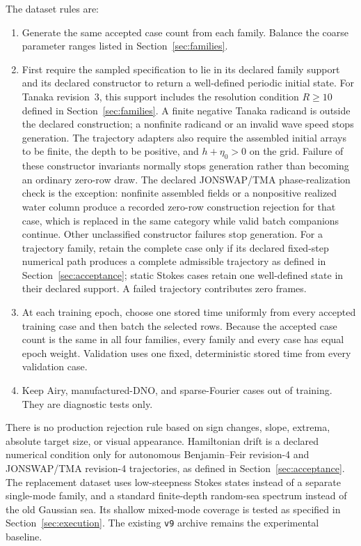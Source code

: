\documentclass[11pt]{article}
\begin{document}
The dataset rules are:
\begin{enumerate}
  \item Generate the same accepted case count from each family.  Balance
        the coarse parameter ranges listed in Section~\ref{sec:families}.
  \item First require the sampled specification to lie in its declared
        family support and its declared constructor to return a well-defined
        periodic initial state.  For Tanaka revision~3, this support includes
        the resolution condition $R\geq10$ defined in
        Section~\ref{sec:families}.  A finite negative Tanaka radicand is
        outside the declared construction; a nonfinite radicand or an invalid
        wave speed stops generation.  The trajectory
        adapters also require the assembled initial arrays to be finite, the
        depth to be positive, and \(h+\eta_0>0\) on the grid.  Failure of
        these constructor invariants normally stops generation rather than
        becoming an ordinary zero-row draw.  The declared JONSWAP/TMA
        phase-realization check is the exception: nonfinite assembled fields
        or a nonpositive realized water column produce a recorded zero-row
        construction rejection for that case, which is replaced in the same
        category while valid batch companions continue.  Other unclassified
        constructor failures stop generation.  For a trajectory
        family, retain the complete case only if its declared fixed-step
        numerical path produces a complete admissible trajectory as
        defined in Section~\ref{sec:acceptance}; static Stokes cases retain
        one well-defined state in their declared support.  A failed
        trajectory contributes zero frames.
  \item At each training epoch, choose one stored time uniformly from every
        accepted training case and then batch the selected rows.  Because the
        accepted case count is the same in all four families, every family and
        every case has equal epoch weight.  Validation uses one fixed,
        deterministic stored time from every validation case.
  \item Keep Airy, manufactured-DNO, and sparse-Fourier cases out of training.
        They are diagnostic tests only.
\end{enumerate}
There is no production rejection rule based on sign changes, slope, extrema,
absolute target size, or visual appearance.  Hamiltonian drift is a declared
numerical condition only for autonomous Benjamin--Feir revision-4 and
JONSWAP/TMA revision-4 trajectories, as defined in Section~\ref{sec:acceptance}.
The replacement dataset uses low-steepness Stokes states instead of a separate
single-mode family, and a standard finite-depth random-sea spectrum instead
of the old Gaussian sea.  Its shallow mixed-mode coverage is tested as
specified in Section~\ref{sec:execution}.  The existing \texttt{v9} archive
remains the experimental baseline.
\end{document}
